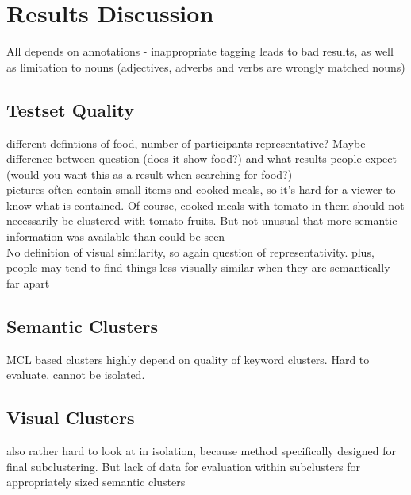 %
\section{Results Discussion}
\label{sec_discussion}


All depends on annotations - inappropriate tagging leads to bad results, as well as limitation to nouns (adjectives, adverbs and verbs are wrongly matched nouns)

\subsection{Testset Quality}
different defintions of food, number of participants representative? Maybe difference between question (does it show food?) and what results people expect (would you want this as a result when searching for food?) \\
pictures often contain small items and cooked meals, so it's hard for a viewer to know what is contained. Of course, cooked meals with tomato in them should not necessarily be clustered with tomato fruits. But not unusual that more semantic information was available than could be seen\\
No definition of visual similarity, so again question of representativity. plus, people may tend to find things less visually similar when they are semantically far apart

\subsection{Semantic Clusters}
MCL based clusters highly depend on quality of keyword clusters. Hard to evaluate, cannot be isolated.


\subsection{Visual Clusters}
also rather hard to look at in isolation, because method specifically designed for final subclustering. But lack of data for evaluation within subclusters for appropriately sized semantic clusters